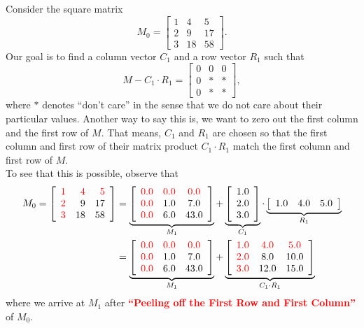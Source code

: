Consider the square matrix 
$$M_0=\left[\begin{array}{rrr} 
    1   &  4   &  5 \\
     2  &   9  &  17 \\
     3  &  18  &  58 \end{array}  \right]. $$
Our goal is to find a column vector $C_1$ and a row vector $R_1$ such that  
$$M-C_1 \cdot R_1 = \left[\begin{array}{rrr} 
    0  &  0   &  0 \\
     0  &   \ast &  \ast \\
    0  &  \ast  &  \ast \end{array}  \right], $$   
where $\ast$ denotes ``don't care'' in the sense that we do not care about their particular values. Another way to say this is, we want to zero out the first column and the first row of $M$. That means, $C_1$ and $R_1$ are chosen so that the first column and first row of their matrix product $C_1 \cdot R_1$ match the first column and first row of $M$.\\

To see that this is possible, observe that
\begin{align*}
M_0  =\left[\begin{array}{rrr} 
\color{red}     1   & \color{red}   4   & \color{red}  5 \\
 \color{red}     2  &   9  &  17 \\
 \color{red}     3  &  18  &  58 \end{array}  \right] &= \underbrace{\left[
\begin{array}{ccc}
\color{red} 0.0 & \color{red} 0.0 & \color{red} 0.0 \\
\color{red} 0.0 & 1.0 & 7.0 \\
\color{red} 0.0 & 6.0 & 43.0 \\
\end{array}
\right]}_{M_1} + \underbrace{\left[
\begin{array}{c}
1.0 \\
2.0 \\
3.0 \\
\end{array}
\right]}_{C_1} \cdot \underbrace{\left[
\begin{array}{ccc}
1.0 & 4.0 & 5.0 \\
\end{array}
\right]}_{R_1} \\
& = \underbrace{\left[
\begin{array}{ccc}
\color{red} 0.0 & \color{red} 0.0 & \color{red} 0.0 \\
\color{red} 0.0 & 1.0 & 7.0 \\
\color{red} 0.0 & 6.0 & 43.0 \\
\end{array}
\right]}_{M_1}  + \underbrace{\left[
\begin{array}{ccc}
\color{red}  1.0 &\color{red}  4.0 &\color{red}  5.0 \\
\color{red} 2.0 & 8.0 & 10.0 \\
\color{red} 3.0 & 12.0 & 15.0 \\
\end{array}
\right]}_{C_1 \cdot R_1}
\end{align*} 
where we arrive at $M_1$ after \textcolor{red}{\bf  ``Peeling off the First Row and First Column''} of $M_0$.\\

